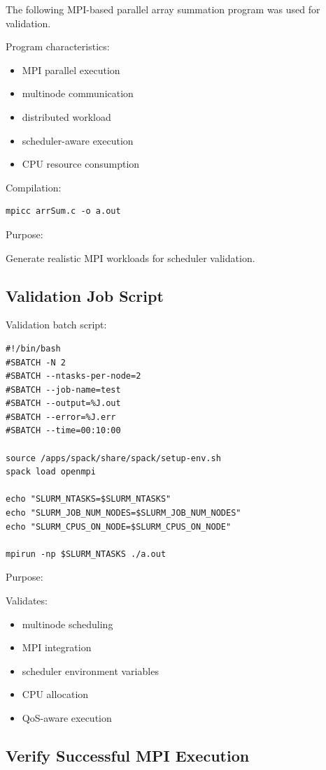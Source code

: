 \documentclass[11pt]{article}
\begin{document}
The following MPI-based parallel array summation program was used for
validation.

Program characteristics:

\begin{itemize}
\item MPI parallel execution
\item multinode communication
\item distributed workload
\item scheduler-aware execution
\item CPU resource consumption
\end{itemize}

Compilation:

\begin{verbatim}
mpicc arrSum.c -o a.out
\end{verbatim}

Purpose:

Generate realistic MPI workloads for scheduler validation.
\subsection{Validation Job Script}
\label{sec:org87174fb}

Validation batch script:

\begin{verbatim}
#!/bin/bash
#SBATCH -N 2
#SBATCH --ntasks-per-node=2
#SBATCH --job-name=test
#SBATCH --output=%J.out
#SBATCH --error=%J.err
#SBATCH --time=00:10:00

source /apps/spack/share/spack/setup-env.sh
spack load openmpi

echo "SLURM_NTASKS=$SLURM_NTASKS"
echo "SLURM_JOB_NUM_NODES=$SLURM_JOB_NUM_NODES"
echo "SLURM_CPUS_ON_NODE=$SLURM_CPUS_ON_NODE"

mpirun -np $SLURM_NTASKS ./a.out
\end{verbatim}

Purpose:

Validates:

\begin{itemize}
\item multinode scheduling
\item MPI integration
\item scheduler environment variables
\item CPU allocation
\item QoS-aware execution
\end{itemize}
\subsection{Verify Successful MPI Execution}
\label{sec:org7a71b51}
\end{document}
